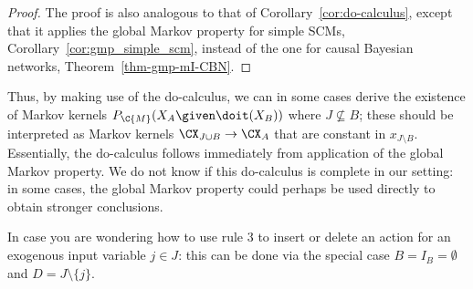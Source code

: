 \begin{proof}
  The proof is also analogous to that of Corollary~\ref{cor:do-calculus}, except that it applies the global
  Markov property for simple SCMs, Corollary~\ref{cor:gmp_simple_scm}, instead of the one for causal Bayesian networks,
  Theorem~\ref{thm-gmp-mI-CBN}. 

\end{proof}

Thus, by making use of the do-calculus, 
we can in some cases derive the existence of Markov kernels $P_{\C{M}}(X_A \given \doit(X_B))$
where $J \not\subseteq B$;
these should be interpreted as Markov kernels $\CX_{J \cup B} \to \CX_{A}$ that are constant in 
$x_{J\setminus B}$. Essentially, the do-calculus follows immediately from application of the global Markov property. 
We do not know if this do-calculus is complete in our setting: in some cases, the global Markov property could perhaps
be used directly to obtain stronger conclusions.

\begin{Rem}
  In case you are wondering how to use rule 3 to insert or delete an action for an exogenous input
  variable $j \in J$: this can be done via the special case $B = I_B = \emptyset$ and $D = J \setminus \{j\}$.
\end{Rem}


